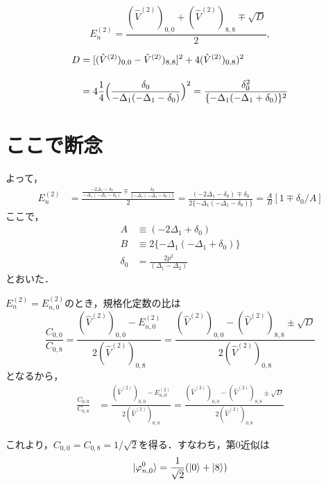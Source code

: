 \begin{equation}
    E^{(2)}_n=\frac{
    (\hat{V}^{(2)})_{0,0} + (\hat{V}^{(2)})_{8,8}
    \mp \sqrt{D}
    }{2},
\end{equation}

\begin{align}
    D&=[(\hat{V}^{(2)})_{0,0} - \hat{V}^{(2)})_{8,8}]^2 + 4(\hat{V}^{(2)})_{0,8})^2\nn[10pt]
    &=4\frac{1}{4}\Bigl(
    \frac{\delta_0}
    {-\Delta_1(-\Delta_1 - \delta_0)}
    \Bigr)^2
    =\frac{\delta_0^2}
    {\{-\Delta_1(-\Delta_1 + \delta_0)\}^2}
\end{align}
\section*{ここで断念}
よって，
\begin{align}
    E^{(2)}_n&=\frac{
    \frac{-2\Delta_1 - \delta_0}{-\Delta_1(-\Delta_1 - \delta_0)}
    \mp 
    \frac{\delta_0}
    {\{-\Delta_1(-\Delta_1 - \delta_0)\}}
    }{2}
    =\frac{
    (-2\Delta_1 - \delta_0)
    \mp \delta_0
    }{2\{-\Delta_1(-\Delta_1 - \delta_0)\}}
    =\frac{A}{B}[1\mp\delta_0/A]
\end{align}
ここで，
\begin{align}
    A&\equiv (-2\Delta_1 + \delta_0)\\[10pt]
    B&\equiv 2\{-\Delta_1(-\Delta_1 + \delta_0)\}\\[10pt]
    \delta_0 &= \frac{2p^2}{(\Delta_{1}-\Delta_{2})}
\end{align}
とおいた．

$E_n^{(2)}=E_{n,0}^{(2)}$のとき，規格化定数の比は
\begin{equation}
    \frac{C_{0,0}}{C_{0,8}} 
    = \frac{(\hat{V}^{(2)})_{0,0} - E_{n,0}^{(2)}}{2(\hat{V}^{(2)})_{0,8} }
    =  \frac{(\hat{V}^{(2)})_{0,0} - (\hat{V}^{(2)})_{8,8} \pm \sqrt{D}}
    {2(\hat{V}^{(2)})_{0,8} }
\end{equation}
となるから，
\begin{align}
    \frac{C_{0,0}}{C_{0,8}} 
    &= \frac{(\hat{V}^{(2)})_{0,0} - E_{n,0}^{(2)}}{2(\hat{V}^{(2)})_{0,8}}
    =  \frac{(\hat{V}^{(2)})_{0,0} - (\hat{V}^{(2)})_{8,8} \pm \sqrt{D}}
    {2(\hat{V}^{(2)})_{0,8} }
\end{align}


これより，$C_{0,0}=C_{0,8}=1/\sqrt{2}$を得る．すなわち，第0近似は
\begin{equation}
    \ket{\varphi_{n,0}^{0}} = \frac{1}{\sqrt{2}}(\ket{0}+\ket{8})
\end{equation}


